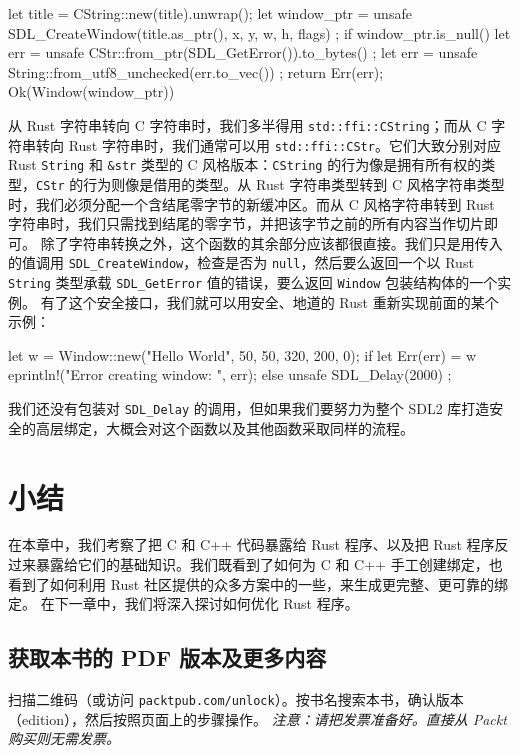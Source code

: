 \begin{codebox}[rust]
let title = CString::new(title).unwrap();
let window_ptr = unsafe {
    SDL_CreateWindow(title.as_ptr(), x, y, w, h, flags)
};
if window_ptr.is_null() {
    let err = unsafe {
        CStr::from_ptr(SDL_GetError()).to_bytes()
    };
    let err = unsafe {
        String::from_utf8_unchecked(err.to_vec())
    };
    return Err(err);
}
Ok(Window(window_ptr))
\end{codebox}
\label{idx:idx_25139128}
从 Rust 字符串转向 C 字符串时，我们多半得用 \texttt{std::\allowbreak{}ffi::\allowbreak{}CString}；而从 C 字符串转向 Rust 字符串时，我们通常可以用 \texttt{std::\allowbreak{}ffi::\allowbreak{}CStr}。它们大致分别对应 Rust \texttt{String} 和 \texttt{\&str} 类型的 C 风格版本：\texttt{CString} 的行为像是拥有所有权的类型，\texttt{CStr} 的行为则像是借用的类型。从 Rust 字符串类型转到 C 风格字符串类型时，我们必须分配一个含结尾零字节的新缓冲区。而从 C 风格字符串转到 Rust 字符串时，我们只需找到结尾的零字节，并把该字节之前的所有内容当作切片即可。
除了字符串转换之外，这个函数的其余部分应该都很直接。我们只是用传入的值调用 \texttt{SDL\_\allowbreak{}CreateWindow}，检查是否为 \texttt{null}，然后要么返回一个以 Rust \texttt{String} 类型承载 \texttt{SDL\_\allowbreak{}GetError} 值的错误，要么返回 \texttt{Window} 包装结构体的一个实例。
\label{idx:idx_f1d6a560}
有了这个安全接口，我们就可以用安全、地道的 Rust 重新实现前面的某个示例：
\begin{codebox}[rust]
let w = Window::new("Hello World", 50, 50, 320, 200, 0);
if let Err(err) = w {
    eprintln!("Error creating window: {}", err);
} else {
    unsafe { SDL_Delay(2000) };
}
\end{codebox}
我们还没有包装对 \texttt{SDL\_Delay} 的调用，但如果我们要努力为整个 SDL2 库打造安全的高层绑定，大概会对这个函数以及其他函数采取同样的流程。
\section{小结}
在本章中，我们考察了把 C 和 C++ 代码暴露给 Rust 程序、以及把 Rust 程序反过来暴露给它们的基础知识。我们既看到了如何为 C 和 C++ 手工创建绑定，也看到了如何利用 Rust 社区提供的众多方案中的一些，来生成更完整、更可靠的绑定。
在下一章中，我们将深入探讨如何优化 Rust 程序。
\begin{samepage}
\subsection{获取本书的 PDF 版本及更多内容}
扫描二维码（或访问 \texttt{packtpub.\allowbreak{}com/\allowbreak{}unlock}）。按书名搜索本书，确认版本（edition），然后按照页面上的步骤操作。
\emph{注意：请把发票准备好。直接从 Packt 购买则无需发票。}
\end{samepage}
